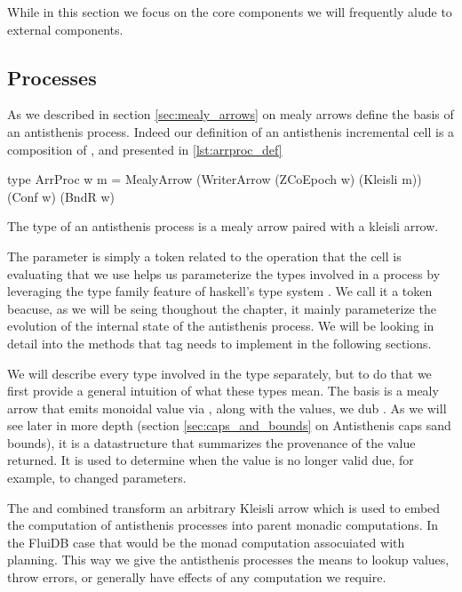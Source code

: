 While in this section we focus on the core components we will
frequently alude to external components.

\subsection{Processes}

As we described in section \ref{sec:mealy_arrows} on mealy arrows
define the basis of an antisthenis process. Indeed our definition of
an antisthenis incremental cell is a composition of ,
 and  presented in
\ref{lst:arrproc_def}

\begin{code}
\begin{haskellcode}
type ArrProc w m =
  MealyArrow (WriterArrow (ZCoEpoch w) (Kleisli m))
  (Conf w) (BndR w)
\end{haskellcode}
\caption{\label{lst:arrproc_def}The type of an antisthenis process is a mealy arrow paired
  with a kleisli arrow.}
\end{code}

The  parameter is simply a token related to the operation that
the cell is evaluating that we use helps us parameterize the types
involved in a process by leveraging the type family feature of
haskell's type system \cite{AssociatedTypeSynonyms}. We call it a
 token beacuse, as we will be seing thoughout the
chapter, it mainly parameterize the evolution of the internal state of
the antisthenis process. We will be looking in detail into the methods
that  tag needs to implement in the following
sections.

We will describe every type involved in the  type
separately, but to do that we first provide a general intuition of
what these types mean. The basis is a mealy arrow that emits monoidal
value via , along with the values, we dub
.  As we will see later in more depth (section
\ref{sec:caps_and_bounds} on Antisthenis caps sand bounds), it is a
datastructure that summarizes the provenance of the value returned. It
is used to determine when the value is no longer valid due, for
example, to changed parameters.

The  and  combined transform an
arbitrary Kleisli arrow which is used to embed the computation of
antisthenis processes into parent monadic computations. In the FluiDB
case that would be the monad computation assocuiated with
planning. This way we give the antisthenis processes the means to
lookup values, throw errors, or generally have effects of any
computation we require.

